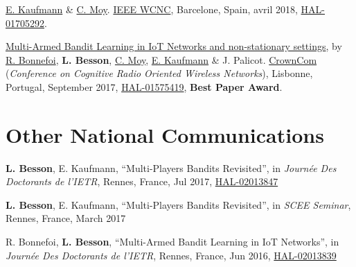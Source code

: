 \begin{etaremune}
  \href{http://chercheurs.lille.inria.fr/ekaufman/research.html}{E.
  Kaufmann} \& \href{https://moychris.wordpress.com/}{C. Moy}.
  \href{http://wcnc2018.ieee-wcnc.org/}{IEEE WCNC}, Barcelone, Spain,
  avril 2018, \href{https://hal.inria.fr/hal-01705292}{HAL-01705292}.
\item
  \href{https://hal.inria.fr/hal-01575419/document}{Multi-Armed Bandit
  Learning in IoT Networks and non-stationary settings}, by
  \href{https://remibonnefoi.wordpress.com/}{R. Bonnefoi}, \textbf{L.
  Besson}, \href{https://moychris.wordpress.com/}{C. Moy},
  \href{http://chercheurs.lille.inria.fr/ekaufman/research.html}{E.
  Kaufmann} \& J. Palicot. \href{http://crowncom.org/2017/}{CrownCom}
  (\emph{Conference on Cognitive Radio Oriented Wireless Networks}),
  Lisbonne, Portugal, September 2017,
  \href{https://hal.inria.fr/hal-01575419}{HAL-01575419}, \textbf{Best Paper Award}.
\end{etaremune}




\section*{Other National Communications}
\renewcommand{\labelenumi}{[ONC-\arabic{enumi}]}
\begin{etaremune}
	\item \textbf{L. Besson}, E. Kaufmann, ``Multi-Players Bandits Revisited'', in \emph{Journ\'{e}e Des Doctorants de l'IETR}, Rennes, France, Jul 2017, \href{https://hal.inria.fr/hal-02013847}{HAL-02013847}
	\item \textbf{L. Besson}, E. Kaufmann, ``Multi-Players Bandits Revisited'', in \emph{SCEE Seminar}, Rennes, France, March 2017
	\item	R. Bonnefoi, \textbf{L. Besson}, ``Multi-Armed Bandit Learning in IoT Networks'', in \emph{Journ\'{e}e Des Doctorants de l'IETR}, Rennes, France, Jun 2016, \href{https://hal.inria.fr/hal-02013839}{HAL-02013839}
\end{etaremune}


